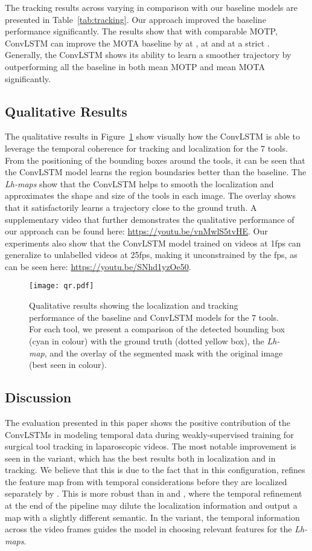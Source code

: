 \documentclass{svjour3}                     \smartqed
\begin{document}
The tracking results across varying  in comparison with our baseline models are presented in Table~\ref{tab:tracking}.
Our approach improved the baseline performance significantly. The results show that with comparable MOTP, ConvLSTM can improve the MOTA baseline by  at ,  at  and  at a strict . Generally, the ConvLSTM shows its ability to learn a smoother trajectory by outperforming all the baseline in both mean MOTP and mean MOTA significantly.

\subsection{Qualitative Results}\label{sec:qualitative_results}
The qualitative results in Figure~\ref{fig:qualitative_results} show visually how the ConvLSTM is able to leverage the temporal coherence for tracking and localization for the 7 tools. 
From the positioning of the bounding boxes around the tools, it can be seen that the ConvLSTM model learns the region boundaries better than the baseline.
The \emph{Lh-maps} show that the ConvLSTM helps to smooth the localization and approximates the shape and size of the tools in each image. The overlay shows that it satisfactorily learns a trajectory close to the ground truth.
A supplementary video that further demonstrates the qualitative performance of our approach can be found here: \url{https://youtu.be/vnMwlS5tvHE}. 
Our experiments also show that the ConvLSTM model trained on videos at 1fps can generalize to unlabelled videos at 25fps, making it unconstrained by the fps, as can be seen here: \url{https://youtu.be/SNhd1yzOe50}.


\begin{figure}[t]\centering
        \texttt{[image: qr.pdf]}
        \caption{Qualitative results showing the localization and tracking performance of the baseline and ConvLSTM models for the 7 tools. For each tool, we present a comparison of the detected bounding box (cyan in colour) with the ground truth (dotted yellow box), the \emph{Lh-map}, and the overlay of the segmented mask with the original image (best seen in colour).}
        \label{fig:qualitative_results} 
\end{figure}

\subsection{Discussion}\label{sec:discussion}
The evaluation presented in this paper shows the positive contribution of the ConvLSTMs in modeling temporal data during weakly-supervised training for surgical tool tracking in laparoscopic videos. 
The most notable improvement is seen in the  variant, which has the best results both in localization and in tracking.
We believe that this is due to the fact that in this configuration,  refines the feature map from  with temporal considerations before they are localized separately by . This is more robust than in  and , where the temporal refinement at the end of the pipeline may dilute the localization information and output a map with a slightly different semantic. In the  variant, the temporal information across the video frames guides the model in choosing relevant features for the \emph{Lh-maps}. 
\end{document}
